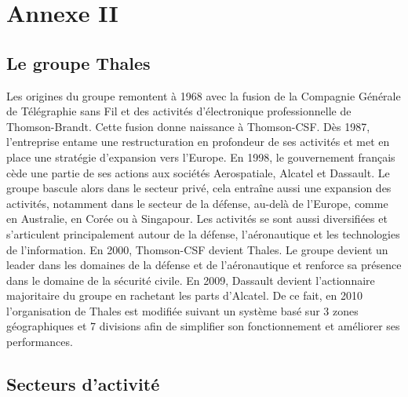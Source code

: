 \chapter{Annexe II}

\section{Le groupe Thales}

Les origines du groupe remontent à 1968 avec la fusion de la Compagnie G\'en\'erale de T\'el\'egraphie sans Fil et des activit\'es d’\'electronique professionnelle de Thomson-Brandt. Cette fusion donne naissance à Thomson-CSF. Dès 1987, l’entreprise entame une restructuration en profondeur de ses activit\'es et met en place une strat\'egie d’expansion vers l’Europe. En 1998, le gouvernement français cède une partie de ses actions aux soci\'et\'es Aerospatiale, Alcatel et Dassault. Le groupe bascule alors dans le secteur priv\'e, cela entraîne aussi une expansion des activit\'es, notamment dans le secteur de la d\'efense, au-delà de l’Europe, comme en Australie, en Cor\'ee ou à Singapour. Les activit\'es se sont aussi diversifi\'ees et s’articulent principalement autour de la d\'efense, l’a\'eronautique et les technologies de l’information. En 2000, Thomson-CSF devient Thales. Le groupe devient un leader dans les domaines de la d\'efense et de l’a\'eronautique et renforce sa pr\'esence dans le domaine de la s\'ecurit\'e civile. En 2009, Dassault devient l’actionnaire majoritaire du groupe en rachetant les parts d’Alcatel. De ce fait, en 2010 l’organisation de Thales est modifi\'ee suivant un système bas\'e sur 3 zones g\'eographiques et 7 divisions afin de simplifier son fonctionnement et am\'eliorer ses performances.

\section{Secteurs d’activit\'e}

